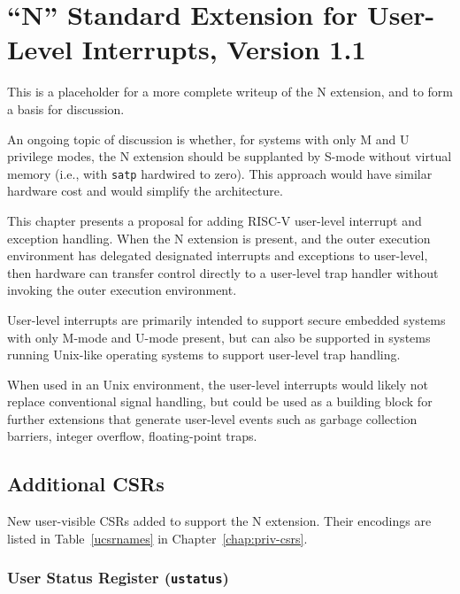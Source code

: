 \chapter{``N'' Standard Extension for User-Level Interrupts, Version 1.1}
\label{chap:n}

\begin{commentary}
  This is a placeholder for a more complete writeup of the N
  extension, and to form a basis for discussion.

  An ongoing topic of discussion is whether, for systems with only M and
  U privilege modes, the N extension should be supplanted by S-mode without
  virtual memory (i.e., with {\tt satp} hardwired to zero).
  This approach would have similar hardware cost and would simplify the
  architecture.
\end{commentary}

This chapter presents a proposal for adding RISC-V user-level
interrupt and exception handling.  When the N extension is present,
and the outer execution environment has delegated designated
interrupts and exceptions to user-level, then hardware can transfer
control directly to a user-level trap handler without invoking the
outer execution environment.

\begin{commentary}
User-level interrupts are primarily intended to support secure
embedded systems with only M-mode and U-mode present, but can also be
supported in systems running Unix-like operating systems to support
user-level trap handling.

When used in an Unix environment, the user-level interrupts would
likely not replace conventional signal handling, but could be used as
a building block for further extensions that generate user-level
events such as garbage collection barriers, integer overflow,
floating-point traps.
\end{commentary}

\section{Additional CSRs}

New user-visible CSRs added to support the N extension.
Their encodings are listed in Table~\ref{ucsrnames} in
Chapter~\ref{chap:priv-csrs}.

\subsection{User Status Register ({\tt ustatus})}

